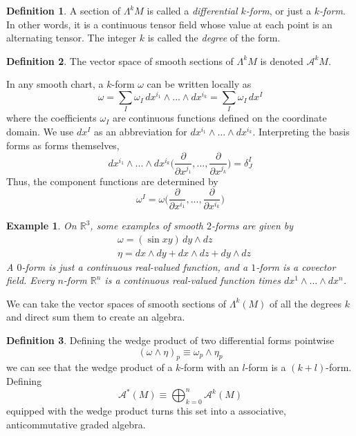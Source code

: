 \documentclass{article}
\newtheorem{example}{Example}[section]
\theoremstyle{remark}
\theoremstyle{definition}
\newtheorem{definition}{Definition}[section]
\begin{document}
\begin{definition}
A section of $\Lambda^k M$ is called a \textit{differential $k$-form}, or just a \textit{$k$-form}. In other words, it is a continuous tensor field whose value at each point is an alternating tensor. The integer $k$ is called the \textit{degree} of the form. 
\end{definition}

\begin{definition}
The vector space of smooth sections of $\Lambda^k M$ is denoted $\mathcal{A}^k M$. 
\end{definition}

In any smooth chart, a $k$-form $\omega$ can be written locally as 
\[\omega = \sum_I \omega_I \, dx^{i_1} \wedge ... \wedge dx^{i_k} = \sum_I \omega_I \, dx^I\]
where the coefficients $\omega_I$ are continuous functions defined on the coordinate domain. We use $dx^I$ as an abbreviation for $dx^{i_1} \wedge ... \wedge dx^{i_k}$. Interpreting the basis forms as forms themselves, 
\[dx^{i_1} \wedge ... \wedge dx^{i_k} \bigg( \frac{\partial}{\partial x^{j_1}}, ..., \frac{\partial}{\partial x^{j_k}} \bigg) = \delta^I_J\]
Thus, the component functions are determined by
\[\omega^I = \omega \bigg( \frac{\partial}{\partial x^{i_1}}, ... ,\frac{\partial}{\partial x^{i_k}} \bigg)\]

\begin{example}
On $\mathbb{R}^3$, some examples of smooth $2$-forms are given by 
\begin{align*}
    & \omega = (\sin{xy}) \,dy \wedge dz \\
    & \eta = dx \wedge dy + dx \wedge dz + dy \wedge dz 
\end{align*}
A $0$-form is just a continuous real-valued function, and a $1$-form is a covector field. Every $n$-form $\mathbb{R}^n$ is a continuous real-valued function times $dx^1 \wedge ... \wedge dx^n$. 
\end{example}

We can take the vector spaces of smooth sections of $\Lambda^k (M)$ of all the degrees $k$ and direct sum them to create an algebra. 

\begin{definition}
Defining the wedge product of two differential forms pointwise
\[(\omega \wedge \eta)_p \equiv \omega_p \wedge \eta_p\]
we can see that the wedge product of a $k$-form with an $l$-form is a $(k+l)$-form. Defining 
\[\mathcal{A}^* (M) \equiv \bigoplus_{k=0}^n \mathcal{A}^k (M)\]
equipped with the wedge product turns this set into a associative, anticommutative graded algebra. 
\end{definition}
\end{document}
